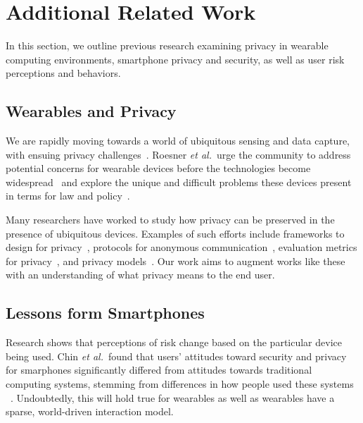 
\section{Additional Related Work}
In this section, we outline previous research examining privacy in wearable computing environments, smartphone privacy and security, as well as user risk perceptions and behaviors.

\subsection{Wearables and Privacy}
We are rapidly moving towards a world of ubiquitous sensing and data capture, with ensuing privacy challenges~\cite{abowd2000charting,palen2003unpacking,camp2000internet}. Roesner {\it et al.}\ urge the community to address potential concerns for wearable devices before the technologies become widespread~\cite{roesner2014security} and explore the unique and difficult problems these devices present in terms for law and policy~\cite{roesner2014augmented}.

Many researchers have worked to study how privacy can be preserved in the presence of ubiquitous devices. Examples of such efforts include frameworks to design for privacy~\cite{bellotti1993design,camp2003designing,langheinrich2001privacy}, protocols for anonymous communication~\cite{cornelius2008anonysense}, evaluation metrics for privacy~\cite{scholtz2004toward}, and privacy models~\cite{hong2004privacy, jiang2002approximate}. Our work aims to augment works like these with an understanding of what privacy means to the end user. 

\subsection{Lessons form Smartphones}
Research shows that perceptions of risk change based on the particular device being used. Chin {\it et al.}\ found that users' attitudes toward security and privacy for smarphones significantly differed from attitudes towards traditional computing systems, stemming from differences in how people used these systems ~\cite{chin2012measuring}. Undoubtedly, this will hold true for wearables as well as wearables have a sparse, world-driven interaction model. 

